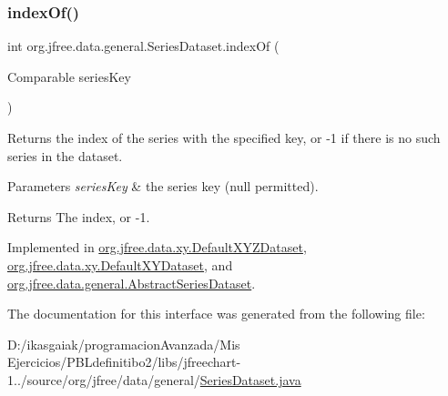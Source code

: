 \subsubsection{\texorpdfstring{index\+Of()}{indexOf()}}
{\footnotesize\ttfamily int org.\+jfree.\+data.\+general.\+Series\+Dataset.\+index\+Of (\begin{DoxyParamCaption}\item[{Comparable}]{series\+Key }\end{DoxyParamCaption})}

Returns the index of the series with the specified key, or -\/1 if there is no such series in the dataset.


\begin{DoxyParams}{Parameters}
{\em series\+Key} & the series key ({\ttfamily null} permitted).\\
\hline
\end{DoxyParams}
\begin{DoxyReturn}{Returns}
The index, or -\/1. 
\end{DoxyReturn}


Implemented in \mbox{\hyperlink{classorg_1_1jfree_1_1data_1_1xy_1_1_default_x_y_z_dataset_a101e4548925084c18e0c2952ac13206f}{org.\+jfree.\+data.\+xy.\+Default\+X\+Y\+Z\+Dataset}}, \mbox{\hyperlink{classorg_1_1jfree_1_1data_1_1xy_1_1_default_x_y_dataset_a436e2b868c431a1d9bc4ce560749334c}{org.\+jfree.\+data.\+xy.\+Default\+X\+Y\+Dataset}}, and \mbox{\hyperlink{classorg_1_1jfree_1_1data_1_1general_1_1_abstract_series_dataset_a7ba00e324a49b6a0126c51b0a2c99abb}{org.\+jfree.\+data.\+general.\+Abstract\+Series\+Dataset}}.



The documentation for this interface was generated from the following file\+:\begin{DoxyCompactItemize}
\item 
D\+:/ikasgaiak/programacion\+Avanzada/\+Mis Ejercicios/\+P\+B\+Ldefinitibo2/libs/jfreechart-\/1../source/org/jfree/data/general/\mbox{\hyperlink{_series_dataset_8java}{Series\+Dataset.\+java}}\end{DoxyCompactItemize}
